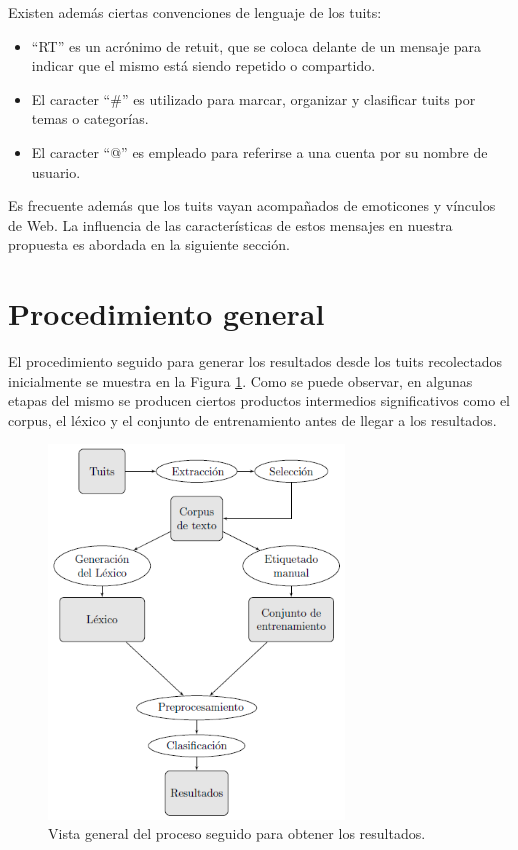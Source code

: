 Existen adem\'as ciertas convenciones de lenguaje de los tuits:
\begin{itemize}
\item ``RT'' es un acr\'onimo de retuit, que se coloca delante de un mensaje para indicar que el mismo est\'a siendo repetido o compartido.
\item El caracter ``\#'' es utilizado para marcar, organizar y clasificar tuits por temas o categor\'ias.
\item El caracter ``@'' es empleado para referirse a una cuenta por su nombre de usuario.
\end{itemize}

Es frecuente adem\'as que los tuits vayan acompa\~nados de emoticones y v\'inculos de Web. La influencia de las caracter\'isticas de estos mensajes en nuestra propuesta es abordada en la siguiente secci\'on.

\section{Procedimiento general}\label{procedimiento}
El procedimiento seguido para generar los resultados desde los tuits recolectados inicialmente se muestra en la Figura \ref{overview}. Como se puede observar, en algunas etapas del mismo se producen ciertos productos intermedios significativos como el corpus, el l\'exico y el conjunto de entrenamiento antes de llegar a los resultados.
\newline

\begin{figure}[h]
\centering
\includegraphics[width=0.7\textwidth]{overview.png}
\caption{Vista general del proceso seguido para obtener los resultados.}
\label{overview}
\end{figure}


